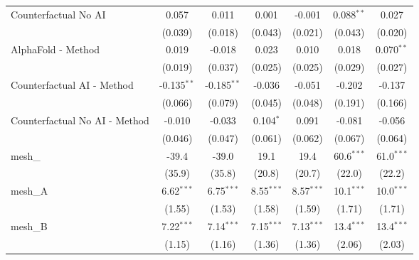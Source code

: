 \begin{tabular}{lcccccc}
   Counterfactual No AI                                        & 0.057         & 0.011         & 0.001         & -0.001        & 0.088$^{**}$  & 0.027\\   
                                                               & (0.039)       & (0.018)       & (0.043)       & (0.021)       & (0.043)       & (0.020)\\   
   AlphaFold - Method                                          & 0.019         & -0.018        & 0.023         & 0.010         & 0.018         & 0.070$^{**}$\\   
                                                               & (0.019)       & (0.037)       & (0.025)       & (0.025)       & (0.029)       & (0.027)\\   
   Counterfactual AI - Method                                  & -0.135$^{**}$ & -0.185$^{**}$ & -0.036        & -0.051        & -0.202        & -0.137\\   
                                                               & (0.066)       & (0.079)       & (0.045)       & (0.048)       & (0.191)       & (0.166)\\   
   Counterfactual No AI - Method                               & -0.010        & -0.033        & 0.104$^{*}$   & 0.091         & -0.081        & -0.056\\   
                                                               & (0.046)       & (0.047)       & (0.061)       & (0.062)       & (0.067)       & (0.064)\\   
   mesh\_                                                      & -39.4         & -39.0         & 19.1          & 19.4          & 60.6$^{***}$  & 61.0$^{***}$\\   
                                                               & (35.9)        & (35.8)        & (20.8)        & (20.7)        & (22.0)        & (22.2)\\   
   mesh\_A                                                     & 6.62$^{***}$  & 6.75$^{***}$  & 8.55$^{***}$  & 8.57$^{***}$  & 10.1$^{***}$  & 10.0$^{***}$\\   
                                                               & (1.55)        & (1.53)        & (1.58)        & (1.59)        & (1.71)        & (1.71)\\   
   mesh\_B                                                     & 7.22$^{***}$  & 7.14$^{***}$  & 7.15$^{***}$  & 7.13$^{***}$  & 13.4$^{***}$  & 13.4$^{***}$\\   
                                                               & (1.15)        & (1.16)        & (1.36)        & (1.36)        & (2.06)        & (2.03)\\   

\end{tabular}
